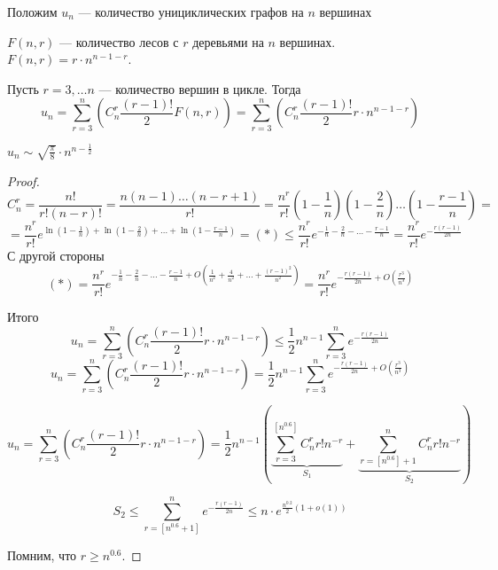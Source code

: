 Положим \(u_n\) --- количество унициклических графов на \(n\) вершинах

\begin{lemma}
    \(F(n, r)\) --- количество лесов с \(r\) деревьями на \(n\) вершинах. \(F(n, r) = r\cdot n^{n - 1 - r}\).
\end{lemma}

Пусть \(r = 3, \dots n\) --- количество вершин в цикле. Тогда
\[u_n = \sum_{r = 3}^n \left(C_n^r \frac{(r - 1)!}{2}F(n, r)\right) = \sum_{r = 3}^n \left(C_n^r \frac{(r - 1)!}{2}r \cdot n^{n - 1 - r}\right)\]

\begin{proposition}
    \(u_n \sim \sqrt{\frac{\pi}{8}}\cdot n^{n - \frac{1}{2}}\)
\end{proposition}

\begin{proof}
    \[C_n^r = \frac{n!}{r!(n - r)!} = \frac{n(n - 1)\dots(n - r + 1)}{r!} = \frac{n^r}{r!}\left(1 - \frac{1}{n}\right)\left(1 - \frac{2}{n}\right)\dots \left(1 - \frac{r-1}{n}\right) = \]
    \[= \frac{n^r}{r!}e^{\ln\left(1 - \frac{1}{n}\right) + \ln\left(1 - \frac{2}{n}\right) + \dots + \ln\left(1 - \frac{r-1}{n}\right)}  = (*) \le \frac{n^r}{r!}e^{-\frac{1}{n}-\frac{2}{n} - \dots - \frac{r - 1}{n}} = \frac{n^r}{r!}e^{-\frac{r(r-1)}{2n}}\]
    С другой стороны
    \[(*) = \frac{n^r}{r!}e^{-\frac{1}{n}-\frac{2}{n} - \dots - \frac{r - 1}{n} + O\left(\frac{1}{n^2} + \frac{4}{n^2} + \dots + \frac{(r - 1)^2}{n^2}\right)} = \frac{n^r}{r!}e^{-\frac{r(r-1)}{2n} + O\left(\frac{r^3}{n^3}\right)}\]

    Итого
    \[u_n = \sum_{r = 3}^n \left(C_n^r \frac{(r - 1)!}{2}r \cdot n^{n - 1 - r}\right) \le \frac{1}{2}n^{n - 1}\sum_{r = 3}^n e^{-\frac{r(r-1)}{2n}}\]
    \[u_n = \sum_{r = 3}^n \left(C_n^r \frac{(r - 1)!}{2}r \cdot n^{n - 1 - r}\right) = \frac{1}{2}n^{n - 1}\sum_{r = 3}^n e^{-\frac{r(r-1)}{2n} + O\left(\frac{r^3}{n^3}\right)}\]
    
    
    \[u_n = \sum_{r = 3}^n \left(C_n^r \frac{(r - 1)!}{2}r \cdot n^{n - 1 - r}\right) = \frac{1}{2}n^{n - 1}\left(\underbrace{\sum_{r = 3}^{[n^{0.6}]} C_n^r r! n^{-r}}_{S_1} + \underbrace{\sum_{r = [n^{0.6}] + 1}^{n} C_n^r r! n^{-r}}_{S_2}\right)\]

    \[S_2 \le \sum_{r = [n^{0.6} + 1]}^ne^{-\frac{r(r-1)}{2n}} \le n \cdot e^{\frac{n^{0.2}}{2}(1 + o(1))}\]
    
    Помним, что \(r \ge n^{0.6}\).


\end{proof}
